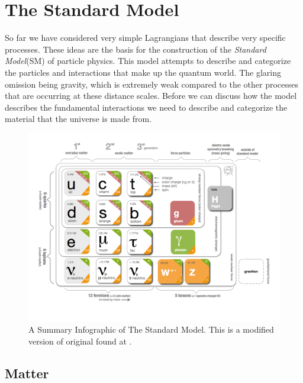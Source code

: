 \section{The Standard Model}
\label{sec:TheSM}
So far we have considered very simple Lagrangians that describe very specific processes. These ideas are the basis for the construction of the \textit{Standard Model}(SM) \cite{StandardModel67_1,StandardModel67_2,StandardModel67_3,StandardModel67_4} of particle physics. This model attempts to describe and categorize the particles and interactions that make up the quantum world. The glaring omission being gravity, which is extremely weak compared to the other processes that are occurring at these distance scales. Before we can discuss how the model describes the fundamental interactions we need to describe and categorize the material that the universe is made from.

\begin{figure}
\begin{center}
\includegraphics[width=\linewidth]{Introduction/SMinfographic_image.png}
\caption{A Summary Infographic of The Standard Model. This is a modified version of original found at \cite{SMinfo:2012sm}.}
\label{fig:TheSM}
\end{center}
\end{figure}

\subsection{Matter}
\label{sec:TheMatter}

